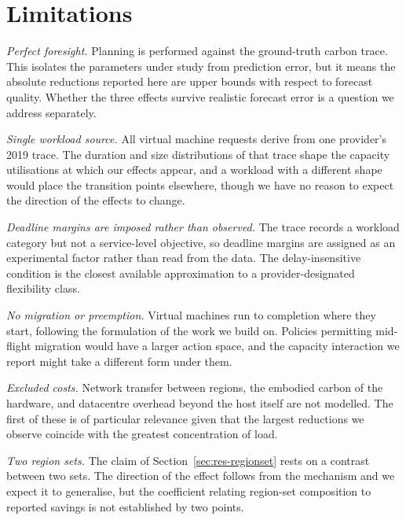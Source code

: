 \section{Limitations}
\label{sec:limitations}

\emph{Perfect foresight.} Planning is performed against the ground-truth carbon
trace. This isolates the parameters under study from prediction error, but it
means the absolute reductions reported here are upper bounds with respect to
forecast quality. Whether the three effects survive realistic forecast error is
a question we address separately.

\emph{Single workload source.} All virtual machine requests derive from one
provider's 2019 trace. The duration and size distributions of that trace shape
the capacity utilisations at which our effects appear, and a workload with a
different shape would place the transition points elsewhere, though we have no
reason to expect the direction of the effects to change.

\emph{Deadline margins are imposed rather than observed.} The trace records a
workload category but not a service-level objective, so deadline margins are
assigned as an experimental factor rather than read from the data. The
delay-insensitive condition is the closest available approximation to a
provider-designated flexibility class.

\emph{No migration or preemption.} Virtual machines run to completion where they
start, following the formulation of the work we build on. Policies permitting
mid-flight migration would have a larger action space, and the capacity
interaction we report might take a different form under them.

\emph{Excluded costs.} Network transfer between regions, the embodied carbon of
the hardware, and datacentre overhead beyond the host itself are not modelled.
The first of these is of particular relevance given that the largest reductions
we observe coincide with the greatest concentration of load.

\emph{Two region sets.} The claim of Section~\ref{sec:res-regionset} rests on a
contrast between two sets. The direction of the effect follows from the
mechanism and we expect it to generalise, but the coefficient relating
region-set composition to reported savings is not established by two points.
